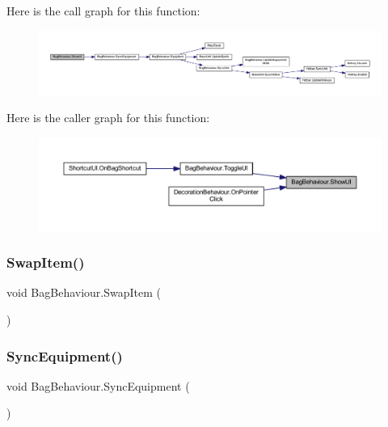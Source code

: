 Here is the call graph for this function\+:
\nopagebreak
\begin{figure}[H]
\begin{center}
\leavevmode
\includegraphics[width=350pt]{class_bag_behaviour_aed83310e460fbfb0fa033cfd9fa41ba5_cgraph}
\end{center}
\end{figure}
Here is the caller graph for this function\+:
\nopagebreak
\begin{figure}[H]
\begin{center}
\leavevmode
\includegraphics[width=350pt]{class_bag_behaviour_aed83310e460fbfb0fa033cfd9fa41ba5_icgraph}
\end{center}
\end{figure}
\mbox{\label{class_bag_behaviour_addf36803ab1e8f36c33054666a9b7618}} 
\subsubsection{\texorpdfstring{SwapItem()}{SwapItem()}}
{\footnotesize\ttfamily void Bag\+Behaviour.\+Swap\+Item (\begin{DoxyParamCaption}{ }\end{DoxyParamCaption})}

\mbox{\label{class_bag_behaviour_ab7a8add6e04a204513a05f0d312df676}} 
\subsubsection{\texorpdfstring{SyncEquipment()}{SyncEquipment()}}
{\footnotesize\ttfamily void Bag\+Behaviour.\+Sync\+Equipment (\begin{DoxyParamCaption}{ }\end{DoxyParamCaption})}

